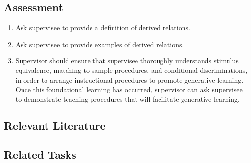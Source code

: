 \subsection{Assessment}
\begin{enumerate}
\item Ask supervisee to provide a definition of derived relations.
\item Ask supervisee to provide examples of derived relations.
\item Supervisor should ensure that supervisee thoroughly understands stimulus equivalence, matching-to-sample procedures, and conditional discriminations, in order to arrange instructional procedures to promote generative learning.  Once this foundational learning has occurred, supervisor can ask supervisee to demonstrate teaching procedures that will facilitate generative learning.
\end{enumerate}
%
\subsection{Relevant Literature}
\begin{refsection}
\nocite{test,alang2017police,clayton2018black}
\printbibliography[heading=none]
\end{refsection}
%
\subsection{Related Tasks}
\foureSix{}\\
\fourFKEleven{}\\
\fourFKTwentyFour{}\\
\fourFKThirtyFour{}\\
%
%
%
%
%
%
%
\section[\fourjFifteen{}]{\fourjFifteen{}%
              }
